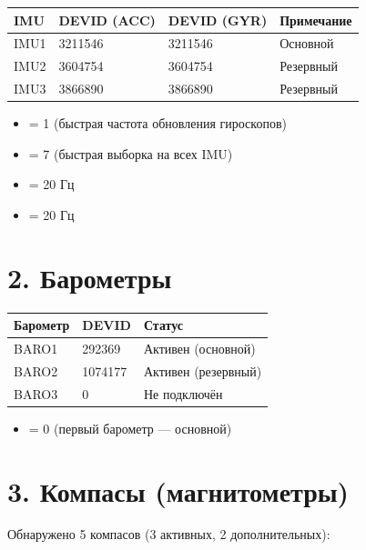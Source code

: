 \documentclass[a4paper,11pt]{article}
\begin{document}
\begin{longtable}{llll}
  \toprule
  \textbf{IMU} & \textbf{DEVID (ACC)} & \textbf{DEVID (GYR)} & \textbf{Примечание} \\
  \midrule
  IMU1 & 3211546 & 3211546 & Основной \\
  IMU2 & 3604754 & 3604754 & Резервный \\
  IMU3 & 3866890 & 3866890 & Резервный \\
  \bottomrule
\end{longtable}

\begin{itemize}[nosep]
  \item {} = 1 (быстрая частота обновления гироскопов)
  \item {} = 7 (быстрая выборка на всех IMU)
  \item {} = 20 Гц
  \item {} = 20 Гц
\end{itemize}

\section{2. Барометры}

\begin{longtable}{lll}
  \toprule
  \textbf{Барометр} & \textbf{DEVID} & \textbf{Статус} \\
  \midrule
  BARO1 & 292369  & Активен (основной) \\
  BARO2 & 1074177 & Активен (резервный) \\
  BARO3 & 0       & Не подключён \\
  \bottomrule
\end{longtable}

\begin{itemize}[nosep]
  \item {} = 0 (первый барометр — основной)
\end{itemize}

\section{3. Компасы (магнитометры)}

Обнаружено 5 компасов (3 активных, 2 дополнительных):
\end{document}
